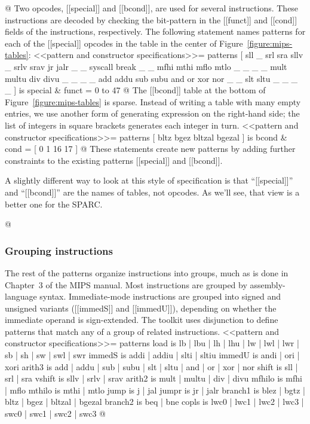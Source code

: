 @
Two opcodes, [[special]] and [[bcond]], are used for several instructions.
These instructions are decoded by checking the bit-pattern in the
[[funct]] and [[cond]] fields of the instructions, respectively.
The following statement names patterns for each of the [[special]] opcodes in the table 
in the center of Figure~\ref{figure:mips-tables}:
<<pattern and constructor specifications>>=
patterns
 [ sll     _       srl     sra     sllv    _       srlv    srav
   jr      jalr    _       _       syscall break   _       _
   mfhi    mthi    mflo    mtlo    _       _       _       _
   mult    multu   div     divu    _       _       _       _
   add     addu    sub     subu    and     or      xor     nor
   _       _       slt     sltu    _       _       _       _ ] 
 is  special & funct = {0 to 47}
@
The [[bcond]] table at the bottom of Figure~\ref{figure:mips-tables}
is sparse.
Instead of writing a table with many empty entries,
we use another form of generating expression on the right-hand side;
the list of integers in square brackets
generates each integer in turn.
<<pattern and constructor specifications>>=
patterns
 [ bltz bgez bltzal bgezal ] is bcond & cond = [ 0 1 16 17 ]
@ These statements create new patterns by adding further constraints to
the existing patterns [[special]] and [[bcond]].

A slightly different way to look at this style of specification is
that ``[[special]]'' and ``[[bcond]]'' are the names of tables, not
opcodes.  As we'll see, that view is a better one for the SPARC.



@
\subsubsection{Grouping instructions}
The rest of the patterns organize instructions into groups, much
as is done in Chapter~3 of the MIPS manual.
Most instructions are grouped by assembly-language syntax.
Immediate-mode instructions are grouped
into signed and unsigned variants ([[immedS]] and [[immedU]]), 
depending on whether the immediate operand
is  sign-extended.
The toolkit uses disjunction to define patterns
that match any of a group of related instructions.
<<pattern and constructor specifications>>=
patterns
  load    is lb | lbu | lh | lhu | lw | lwl | lwr | sb | sh | sw | swl | swr 
  immedS  is addi | addiu | slti | sltiu
  immedU  is andi | ori | xori 
  arith3  is add | addu | sub | subu | slt | sltu | and | or | xor | nor 
  shift   is sll | srl | sra
  vshift  is sllv | srlv | srav 
  arith2  is mult | multu | div | divu
  mfhilo is mfhi | mflo 
  mthilo is mthi | mtlo
  jump    is j  | jal
  jumpr   is jr | jalr
  branch1 is blez | bgtz | bltz | bgez | bltzal | bgezal
  branch2 is beq | bne
  copls   is lwc0 | lwc1 | lwc2 | lwc3 | swc0 | swc1 | swc2 | swc3
@
